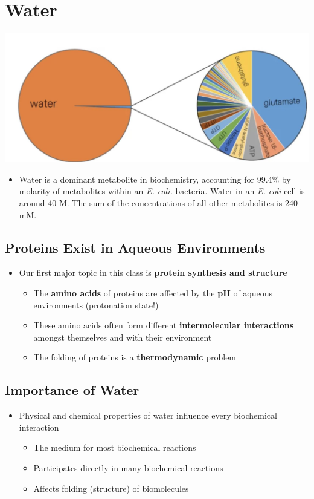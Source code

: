 \documentclass[10pt]{article}
\begin{document}
\section*{Water}
\begin{center}
    \includegraphics*[width=\textwidth]{L1_6.png}
\end{center}
\begin{itemize}
    \item Water is a dominant metabolite in biochemistry, accounting for 99.4\% by molarity of metabolites within an \textit{E. coli.} bacteria.  Water in an \textit{E. coli} cell is around 40 M.  The sum of the concentrations of all other metabolites is 240 mM.
\end{itemize}
\subsection*{Proteins Exist in Aqueous Environments}
\begin{itemize}
    \item Our first major topic in this class is \textbf{protein synthesis and structure}
    \begin{itemize}
        \item The \textbf{amino acids} of proteins are affected by the \textbf{pH} of aqueous environments (protonation state!)
        \item These amino acids often form different \textbf{intermolecular interactions} amongst themselves and with their environment
        \item The folding of proteins is a \textbf{thermodynamic} problem
    \end{itemize}
\end{itemize}
\subsection*{Importance of Water}
\begin{itemize}
    \item Physical and chemical properties of water influence every biochemical interaction
    \begin{itemize}
        \item The medium for most biochemical reactions
        \item Participates directly in many biochemical reactions
        \item Affects folding (structure) of biomolecules
    \end{itemize}
\end{itemize}
\end{document}
